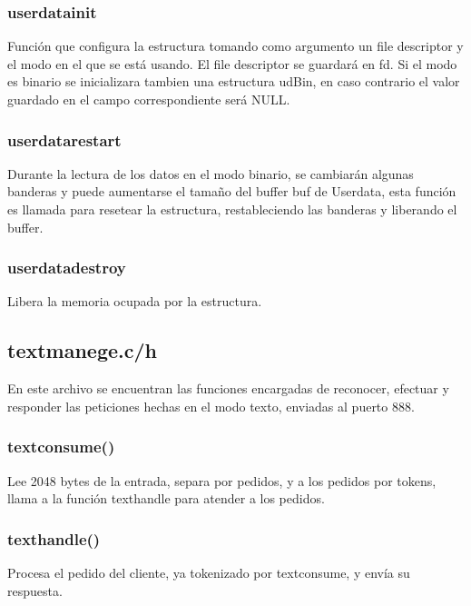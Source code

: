 \documentclass{article}
\begin{document}
\subsubsection{user\textunderscore data\textunderscore init}

Función que configura la estructura tomando como argumento un file descriptor y el modo en el que se está usando. El file descriptor se guardará en fd. Si el modo es binario se inicializara tambien una estructura udBin, en caso contrario el valor guardado en el campo correspondiente será NULL.

\subsubsection{user\textunderscore data\textunderscore restart}

Durante la lectura de los datos en el modo binario, se cambiarán algunas banderas y puede aumentarse el tamaño del buffer buf de User\textunderscore data, esta función es llamada para resetear la estructura, restableciendo las banderas y liberando el buffer.

\subsubsection{user\textunderscore data\textunderscore destroy}

Libera la memoria ocupada por la estructura.


\subsection{text\textunderscore manege.c/h}
En este archivo se encuentran las funciones encargadas de reconocer, efectuar y responder las peticiones hechas en el modo texto, enviadas al puerto 888.


\subsubsection{text\textunderscore consume()}
Lee 2048 bytes de la entrada, separa por pedidos, y a los pedidos por tokens, llama a la función text\textunderscore handle para atender a los pedidos.

\subsubsection{text\textunderscore handle()}
Procesa el pedido del cliente, ya tokenizado por text\textunderscore consume, y envía su respuesta.
\end{document}

